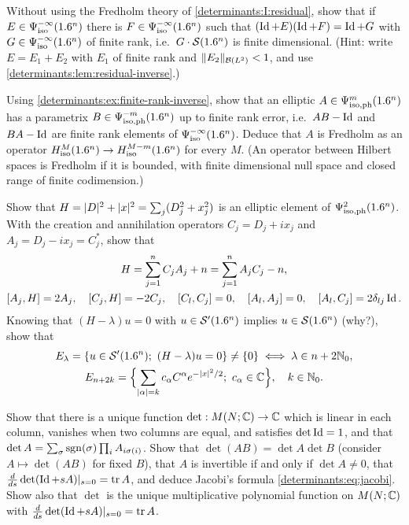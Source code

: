 \begin{exercise}\label{determinants:ex:finite-rank-inverse}
  Without using the Fredholm theory of \ref{determinants:I:residual}, show that
  if $E\in\Psi^{-\infty}_{\mathrm{iso}}(1.6^n)$ there is $F\in\Psi^{-\infty}_{\mathrm{iso}}(1.6^n)$ such
  that $(\operatorname{Id}+E)(\operatorname{Id}+F)=\operatorname{Id}+G$ with $G\in\Psi^{-\infty}_{\mathrm{iso}}(1.6^n)$ of finite rank,
  i.e.\ $G\cdot\mathcal{S}(1.6^n)$ is finite dimensional. (Hint: write $E=E_1+E_2$ with
  $E_1$ of finite rank and $\lVert E_2\rVert_{\mathcal{B}(L^2)}<1$, and use
  \cref{determinants:lem:residual-inverse}.)
\end{exercise}

\begin{exercise}\label{determinants:ex:fredholm}
  Using \cref{determinants:ex:finite-rank-inverse}, show that an elliptic
  $A\in\Psi^{m}_{\mathrm{iso,ph}}(1.6^n)$ has a parametrix $B\in\Psi^{-m}_{\mathrm{iso,ph}}(1.6^n)$ up to finite
  rank error, i.e.\ $AB-\operatorname{Id}$ and $BA-\operatorname{Id}$ are finite rank elements of
  $\Psi^{-\infty}_{\mathrm{iso}}(1.6^n)$. Deduce that $A$ is Fredholm as an operator
  $H^{M}_{\mathrm{iso}}(1.6^n)\to H^{M-m}_{\mathrm{iso}}(1.6^n)$ for every $M$.
  (An operator between Hilbert spaces is Fredholm if it is bounded, with finite
  dimensional null space and closed range of finite codimension.)
\end{exercise}

\begin{exercise}\label{determinants:ex:oscillator}
  Show that $H=\lvert D\rvert^2+\lvert x\rvert^2=\sum_j(D_j^2+x_j^2)$ is an elliptic element of
  $\Psi^{2}_{\mathrm{iso,ph}}(1.6^n)$. With the creation and annihilation operators
  $C_j=D_j+ix_j$ and $A_j=D_j-ix_j=C_j^*$, show that
  \begin{gather*}
    H=\sum_{j=1}^nC_jA_j+n=\sum_{j=1}^nA_jC_j-n,\\
    [A_j,H]=2A_j,\quad[C_j,H]=-2C_j,\quad[C_l,C_j]=0,\quad[A_l,A_j]=0,\quad[A_l,C_j]=2\delta_{lj}\operatorname{Id} .
  \end{gather*}
  Knowing that $(H-\lambda)u=0$ with $u\in\mathcal{S}'(1.6^n)$ implies $u\in\mathcal{S}(1.6^n)$
  (why?), show that
  \begin{gather*}
    E_\lambda=\{u\in\mathcal{S}'(1.6^n);\ (H-\lambda)u=0\}\ne\{0\}\iff\lambda\in n+2\mathbb{N}_0,\\
    E_{n+2k}=\Bigl\{\sum_{\lvert \alpha\rvert=k}c_\alpha C^\alpha e^{-\lvert x\rvert^2/2};\ c_\alpha\in\mathbb{C}\Bigr\},\quad k\in\mathbb{N}_0 .
  \end{gather*}
\end{exercise}

\begin{exercise}\label{determinants:ex:matrix-det}
  Show that there is a unique function $\det:M(N;\mathbb{C})\to\mathbb{C}$ which is linear in
  each column, vanishes when two columns are equal, and satisfies
  $\det\operatorname{Id}=1$, and that
  $\det A=\sum_{\sigma}\operatorname{sgn}(\sigma)\prod_iA_{i\sigma(i)}$. Show that
  $\det(AB)=\det A\det B$ (consider $A\mapsto\det(AB)$ for fixed $B$), that $A$
  is invertible if and only if $\det A\ne0$, that
  $\frac{d}{ds}\det(\operatorname{Id}+sA)|_{s=0}=\operatorname{tr} A$, and deduce Jacobi's formula
  \eqref{determinants:eq:jacobi}. Show also that $\det$ is the unique
  multiplicative polynomial function on $M(N;\mathbb{C})$ with
  $\frac{d}{ds}\det(\operatorname{Id}+sA)|_{s=0}=\operatorname{tr} A$.
\end{exercise}

